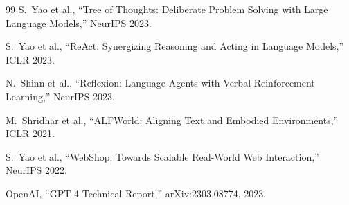 \documentclass[11pt]{article}
\begin{document}
\begin{thebibliography}{99}
S.~Yao et al., ``Tree of Thoughts: Deliberate Problem Solving with
Large Language Models,'' NeurIPS 2023.

S.~Yao et al., ``ReAct: Synergizing Reasoning and Acting in Language
Models,'' ICLR 2023.

N.~Shinn et al., ``Reflexion: Language Agents with Verbal
Reinforcement Learning,'' NeurIPS 2023.

M.~Shridhar et al., ``ALFWorld: Aligning Text and Embodied
Environments,'' ICLR 2021.

S.~Yao et al., ``WebShop: Towards Scalable Real-World Web
Interaction,'' NeurIPS 2022.

OpenAI, ``GPT-4 Technical Report,'' arXiv:2303.08774, 2023.

\end{thebibliography}
\end{document}
